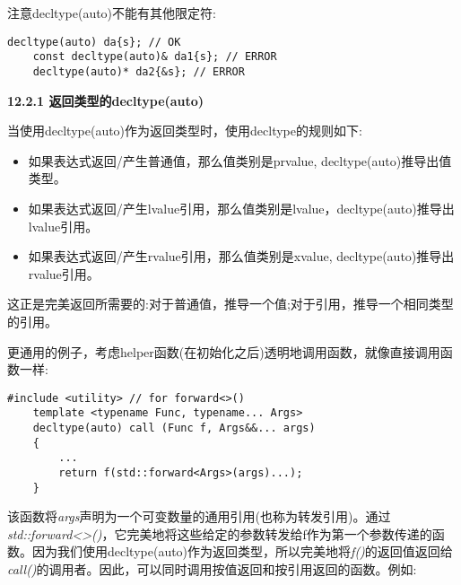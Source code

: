 注意decltype(auto)不能有其他限定符:\par

\begin{lstlisting}[caption={}]
	decltype(auto) da{s}; // OK
	const decltype(auto)& da1{s}; // ERROR
	decltype(auto)* da2{&s}; // ERROR
\end{lstlisting}

\hspace*{\fill} \par %
\textbf{12.2.1 返回类型的decltype(auto)}

当使用decltype(auto)作为返回类型时，使用decltype的规则如下:\par

\begin{itemize}
	\item 如果表达式返回/产生普通值，那么值类别是prvalue, decltype(auto)推导出值类型。
	\item 如果表达式返回/产生lvalue引用，那么值类别是lvalue，decltype(auto)推导出lvalue引用。
	\item 如果表达式返回/产生rvalue引用，那么值类别是xvalue, decltype(auto)推导出rvalue引用。
\end{itemize}

这正是完美返回所需要的:对于普通值，推导一个值;对于引用，推导一个相同类型的引用。\par

更通用的例子，考虑helper函数(在初始化之后)透明地调用函数，就像直接调用函数一样:\par

{\color{red}{generic/call.hpp}}

\begin{lstlisting}[caption={}]
	#include <utility> // for forward<>()
	template <typename Func, typename... Args>
	decltype(auto) call (Func f, Args&&... args)
	{
		...
		return f(std::forward<Args>(args)...);
	}
\end{lstlisting}

该函数将\textit{args}声明为一个可变数量的通用引用(也称为转发引用)。通过\textit{std::forward<>()}，它完美地将这些给定的参数转发给f作为第一个参数传递的函数。因为我们使用decltype(auto)作为返回类型，所以完美地将\textit{f()}的返回值返回给\textit{call()}的调用者。因此，可以同时调用按值返回和按引用返回的函数。例如:\par

{\color{red}{generic/call.cpp}}

